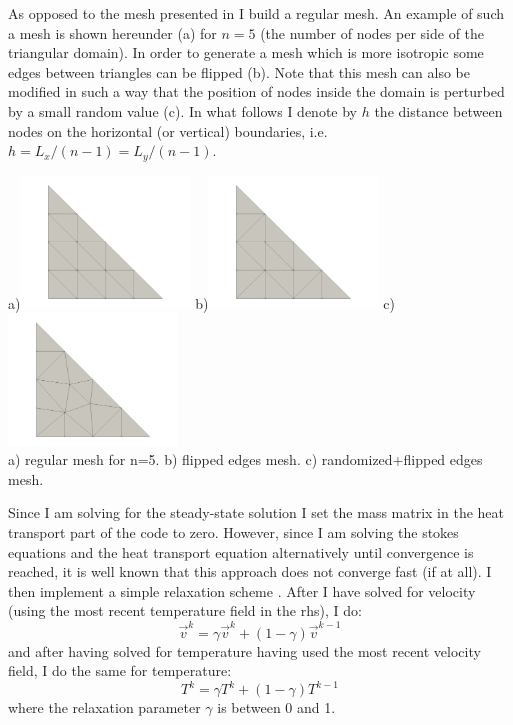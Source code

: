 As opposed to the mesh presented in \cite{jolm17} I build a regular mesh.
An example of such a mesh is shown hereunder (a) for $n=5$ (the number of nodes
per side of the triangular domain). 
In order to generate a mesh which is more isotropic some edges between 
triangles can be flipped (b). 
Note that this mesh can also be modified in such a way that the position of 
nodes inside the domain is perturbed by a small random value (c).
In what follows I denote by $h$ the distance between nodes
on the horizontal (or vertical) boundaries, i.e. $h=L_x/(n-1)=L_y/(n-1)$.
\begin{center}
a)\includegraphics[width=4.5cm]{python_codes/fieldstone_51/images/minigrid5a}
b)\includegraphics[width=4.5cm]{python_codes/fieldstone_51/images/minigrid5b}
c)\includegraphics[width=4.5cm]{python_codes/fieldstone_51/images/minigrid5c}\\
{\small a) regular mesh for n=5. b) flipped edges mesh. c) randomized+flipped edges mesh.}
\end{center}

Since I am solving for the steady-state solution I set the mass matrix in the 
heat transport part of the code to zero. However, since I am solving the stokes equations
and the heat transport equation alternatively until convergence is reached, it is well 
known that this approach does not converge fast (if at all). 
I then implement a simple relaxation scheme \cite{vyrc13}. After I have solved for velocity (using the 
most recent temperature field in the rhs), I do:
\[
\vec{v}^k = \gamma \vec{v}^k + (1-\gamma) \vec{v}^{k-1}
\]
and after having solved for temperature having used the most recent velocity field, 
I do the same for temperature:
\[
{T}^k = \gamma {T}^k + (1-\gamma) {T}^{k-1}
\]
where the relaxation parameter $\gamma$ is between 0 and 1.




